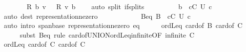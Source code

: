 \begin{isabellebody}
\ \ \ \ \ \ \isamarkupfalse%
\ {\isacartoucheopen}{\isacharquery}{\kern0pt}R{\isacharprime}{\kern0pt}\ b\ v\ {\isasymnoteq}\ {}{\isacartoucheclose}\ {\isacartoucheopen}{\isacharquery}{\kern0pt}R\ v\ b\ {\isasymnoteq}\ {}{\isacartoucheclose}\ \isamarkupfalse%
\ {\isacharparenleft}{\kern0pt}auto\ split{\isacharcolon}{\kern0pt}\ if{\isacharunderscore}{\kern0pt}splits{\isacharparenright}{\kern0pt}\isanewline
\ \ \ \ \ \ \isamarkupfalse%
\ \isamarkupfalse%
\ {\isacartoucheopen}b\ {\isasymin}\ {\isacharparenleft}{\kern0pt}{\isasymUnion}c{\isasymin}C{\isachardot}{\kern0pt}\ {\isacharquery}{\kern0pt}U\ c{\isacharparenright}{\kern0pt}{\isacartoucheclose}\isanewline
\ \ \ \ \ \ \ \ \isamarkupfalse%
\ {\isacharparenleft}{\kern0pt}auto\ dest{\isacharcolon}{\kern0pt}\ representation{\isacharunderscore}{\kern0pt}ne{\isacharunderscore}{\kern0pt}zero{\isacharparenright}{\kern0pt}\isanewline
\ \ \ \ \isamarkupfalse%
\isanewline
\ \ \ \ \isamarkupfalse%
\ \isamarkupfalse%
\ B{\isacharunderscore}{\kern0pt}eq{\isacharcolon}{\kern0pt}\ {\isacartoucheopen}B\ {\isacharequal}{\kern0pt}\ {\isacharparenleft}{\kern0pt}{\isasymUnion}c{\isasymin}C{\isachardot}{\kern0pt}\ {\isacharquery}{\kern0pt}U\ c{\isacharparenright}{\kern0pt}{\isacartoucheclose}\isanewline
\ \ \ \ \ \ \isamarkupfalse%
\ {\isacharparenleft}{\kern0pt}auto\ intro{\isacharcolon}{\kern0pt}\ span{\isacharunderscore}{\kern0pt}base\ representation{\isacharunderscore}{\kern0pt}ne{\isacharunderscore}{\kern0pt}zero\ eq{\isacharparenright}{\kern0pt}\isanewline
\ \ \ \ \isamarkupfalse%
\ {\isachardoublequoteopen}ordLeq{}\ {\isacharparenleft}{\kern0pt}card{\isacharunderscore}{\kern0pt}of\ B{\isacharparenright}{\kern0pt}\ {\isacharparenleft}{\kern0pt}card{\isacharunderscore}{\kern0pt}of\ C{\isacharparenright}{\kern0pt}{\isachardoublequoteclose}\isanewline
\ \ \ \ \isamarkupfalse%
\ {\isacharparenleft}{\kern0pt}subst\ B{\isacharunderscore}{\kern0pt}eq{\isacharcomma}{\kern0pt}\ rule\ card{\isacharunderscore}{\kern0pt}of{\isacharunderscore}{\kern0pt}UNION{\isacharunderscore}{\kern0pt}ordLeq{\isacharunderscore}{\kern0pt}infinite{\isacharbrackleft}{\kern0pt}OF\ {\isacartoucheopen}infinite\ C{\isacartoucheclose}{\isacharbrackright}{\kern0pt}{\isacharparenright}{\kern0pt}\isanewline
\ \ \ \ \ \ \isamarkupfalse%
\ {\isachardoublequoteopen}ordLeq{}\ {\isacharparenleft}{\kern0pt}card{\isacharunderscore}{\kern0pt}of\ C{\isacharparenright}{\kern0pt}\ {\isacharparenleft}{\kern0pt}card{\isacharunderscore}{\kern0pt}of\ C{\isacharparenright}{\kern0pt}{\isachardoublequoteclose}\isanewline

\end{isabellebody}
